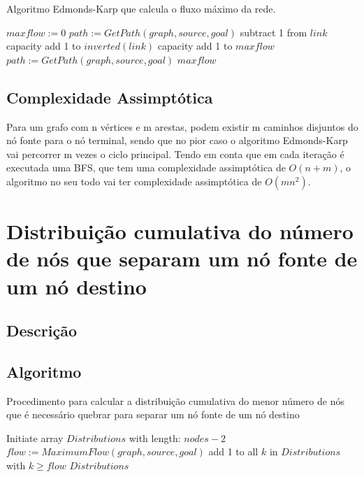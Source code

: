 \documentclass[12pt,a4paper]{scrartcl}
\begin{document}
\begin{algorithm}
\caption{Algoritmo Edmonds-Karp que calcula o fluxo máximo da rede.}\label{alg:residual_network}
\begin{algorithmic}[1]
    \State $maxflow := 0 $
    \State $path := GetPath(graph,source,goal)$
      		\State subtract 1 from $link$ capacity
        	\State add 1 to $inverted(link)$ capacity
      \EndFor
      \State add 1 to $maxflow$
      \State $path := GetPath(graph,source,goal)$
  	\EndWhile
  	\Return $maxflow$
\EndProcedure
\end{algorithmic}
\end{algorithm}

\subsection{Complexidade Assimptótica}

Para um grafo com n vértices e m arestas, podem existir m caminhos disjuntos do nó fonte para o nó terminal, sendo que no pior caso o algoritmo Edmonds-Karp vai percorrer m vezes o ciclo principal.
Tendo em conta que em cada iteração é executada uma BFS, que tem uma complexidade assimptótica de $O(n+m)$, o algoritmo no seu todo vai ter complexidade assimptótica de $O(m n^2)$.

\section{Distribuição cumulativa do número de nós que separam um nó fonte de um nó destino}

\subsection{Descrição}

\subsection{Algoritmo}

\begin{algorithm}
\caption{Procedimento para calcular a distribuição cumulativa do menor número de nós que é necessário quebrar para separar um nó fonte de um nó destino}\label{alg:distribution}
\begin{algorithmic}[1]
	\State Initiate array $Distributions$ with length: $nodes - 2$
          	  \State $flow := MaximumFlow(graph,source,goal)$
              \State add 1 to all $k$ in $Distributions$ with $k \geq flow$
      \EndFor
    \EndFor
  	\Return $Distributions$
\EndProcedure
\end{algorithmic}
\end{algorithm}
\end{document}
